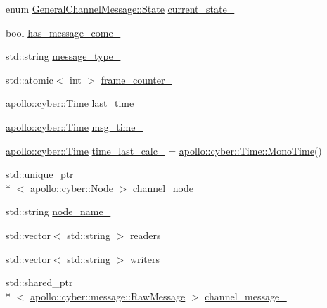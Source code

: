 \begin{DoxyCompactItemize}
\item 
enum \hyperlink{classGeneralChannelMessage_aa051da5753574d8fe644fdbcc2cd2412}{General\-Channel\-Message\-::\-State} \hyperlink{classGeneralChannelMessage_a7b1412a227a2ec0d3baedc0938f931df}{current\-\_\-state\-\_\-}
\item 
bool \hyperlink{classGeneralChannelMessage_af5e386e99b7a8722b485d027e2ed75bd}{has\-\_\-message\-\_\-come\-\_\-}
\item 
std\-::string \hyperlink{classGeneralChannelMessage_a1d25120dc72e5010565823a544783efc}{message\-\_\-type\-\_\-}
\item 
std\-::atomic$<$ int $>$ \hyperlink{classGeneralChannelMessage_a3da8072e2c9d5ed6b510378384d2dc4f}{frame\-\_\-counter\-\_\-}
\item 
\hyperlink{classapollo_1_1cyber_1_1Time}{apollo\-::cyber\-::\-Time} \hyperlink{classGeneralChannelMessage_a8ff50746033122e3479db0cd923a8860}{last\-\_\-time\-\_\-}
\item 
\hyperlink{classapollo_1_1cyber_1_1Time}{apollo\-::cyber\-::\-Time} \hyperlink{classGeneralChannelMessage_a10a1b559a2fd9741bb268fbe1c4290d2}{msg\-\_\-time\-\_\-}
\item 
\hyperlink{classapollo_1_1cyber_1_1Time}{apollo\-::cyber\-::\-Time} \hyperlink{classGeneralChannelMessage_ad1f7f60900caf4cc8cfba0fb83961a43}{time\-\_\-last\-\_\-calc\-\_\-} = \hyperlink{classapollo_1_1cyber_1_1Time_abb3f07caa00e1e76d3040e9f725afc09}{apollo\-::cyber\-::\-Time\-::\-Mono\-Time}()
\item 
std\-::unique\-\_\-ptr\\*
$<$ \hyperlink{classapollo_1_1cyber_1_1Node}{apollo\-::cyber\-::\-Node} $>$ \hyperlink{classGeneralChannelMessage_a9663241eded60406a25281d650713ec5}{channel\-\_\-node\-\_\-}
\item 
std\-::string \hyperlink{classGeneralChannelMessage_a123a419e25302adacba1f1984bc70b22}{node\-\_\-name\-\_\-}
\item 
std\-::vector$<$ std\-::string $>$ \hyperlink{classGeneralChannelMessage_a2839fca91027887bdb8c7e9df077c105}{readers\-\_\-}
\item 
std\-::vector$<$ std\-::string $>$ \hyperlink{classGeneralChannelMessage_aff8aed1cdbd9bfebcea0b2bb5f5c6c5b}{writers\-\_\-}
\item 
std\-::shared\-\_\-ptr\\*
$<$ \hyperlink{structapollo_1_1cyber_1_1message_1_1RawMessage}{apollo\-::cyber\-::message\-::\-Raw\-Message} $>$ \hyperlink{classGeneralChannelMessage_a6b288701779537fb1a9846214d9ebeac}{channel\-\_\-message\-\_\-}

\end{DoxyCompactItemize}
